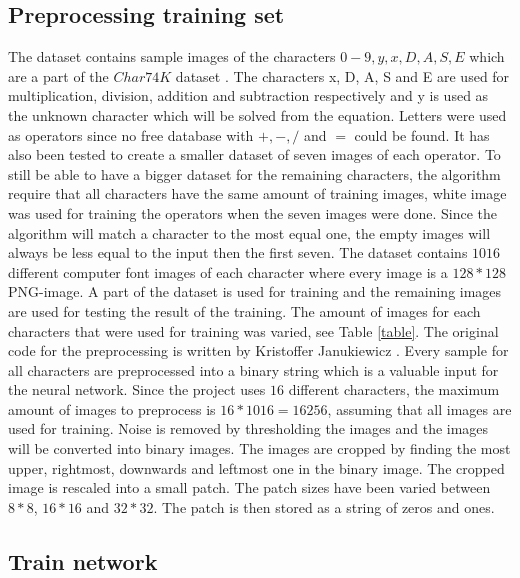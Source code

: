 \documentclass[12pt]{report}
\begin{document}
\subsection*{Preprocessing training set}

The dataset contains sample images of the characters $0-9, y, x, D , A, S, E$ which are a part of the $Char74K$ dataset \cite{dataset}. The characters x, D, A, S and E are used for multiplication, division, addition and subtraction respectively and y is used as the unknown character which will be solved from the equation. Letters were used as operators since no free database with $+,-,/$ and $=$ could be found. It has also been tested to create a smaller dataset of seven images of each operator. To still be able to have a bigger dataset for the remaining characters, the algorithm require that all characters have the same amount of training images, white image was used for training the operators when the seven images were done. Since the algorithm will match a character to the most equal one, the empty images will always be less equal to the input then the first seven.  
\newline
\newline
The dataset contains $1016$ different computer font images of each character where every image is a $128*128$ PNG-image. A part of the dataset is used for training and the remaining images are used for testing the result of the training. The amount of images for each characters that were used for training was varied, see Table \ref{table}.
\newline
\newline
The original code for the preprocessing is written by Kristoffer Janukiewicz \cite{preprocessing}. Every sample for all characters are preprocessed into a binary string which is a valuable input for the neural network. Since the project uses $16$ different characters, the maximum amount of images to preprocess is $16*1016 = 16256$, assuming that all images are used for training. Noise is removed by thresholding the images and the images will be converted into binary images. The images are cropped by finding the most upper, rightmost, downwards and leftmost one in the binary image. The cropped image is rescaled into a small patch. The patch sizes have been varied between $8*8$, $16*16$ and $32*32$. The patch is then stored as a string of zeros and ones. 


\subsection*{Train network}
\end{document}
